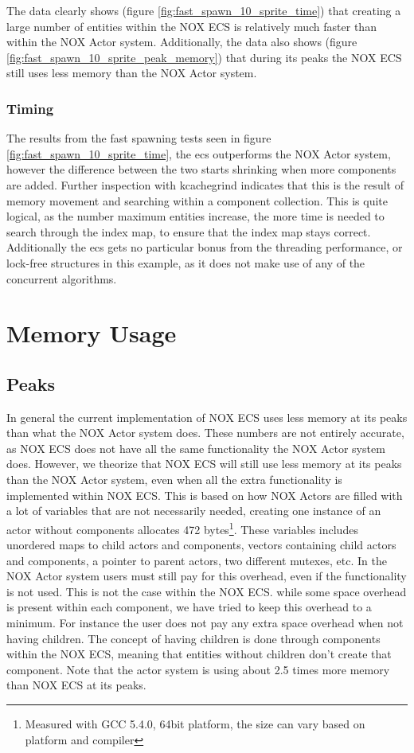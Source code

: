 The data clearly shows (figure \ref{fig:fast_spawn_10_sprite_time}) that creating a large number of entities within the NOX ECS is relatively much faster than within the NOX Actor system.
Additionally, the data also shows (figure \ref{fig:fast_spawn_10_sprite_peak_memory}) that during its peaks the NOX ECS still uses less memory than the NOX Actor system.

\subsubsection{Timing}
The results from the fast spawning tests seen in figure \ref{fig:fast_spawn_10_sprite_time},
the ecs outperforms the NOX Actor system, however the difference between the two
starts shrinking when more components are added.
Further inspection with kcachegrind indicates that this is the result of memory movement and searching within a component collection.
This is quite logical, as the number maximum entities increase, the more time is needed
to search through the index map, to ensure that the index map stays correct.
Additionally the ecs gets no particular bonus from the threading performance, or lock-free structures
in this example, as it does not make use of any of the concurrent algorithms.

\section{Memory Usage}
\subsection{Peaks}
In general the current implementation of NOX ECS uses less memory at its peaks than what the NOX Actor system does.
These numbers are not entirely accurate, as NOX ECS does not have all the same functionality the NOX Actor system does.
However, we theorize that NOX ECS will still use less memory at its peaks than the NOX Actor system, even when
all the extra functionality is implemented within NOX ECS.
This is based on how NOX Actors are filled with a lot of variables that are not necessarily needed,
creating one instance of an actor without components allocates 472 bytes\footnote{Measured with GCC 5.4.0, 64bit platform, the size can vary based on platform and compiler}.
These variables includes unordered maps to child actors and components, vectors containing child actors and components,
a pointer to parent actors, two different mutexes, etc.
In the NOX Actor system users must still pay for this overhead, even if the functionality is not used.
This is not the case within the NOX ECS.
while some space overhead is present within each component, we have tried to keep this overhead to a minimum.
For instance the user does not pay any extra space overhead when not having children.
The concept of having children is done through components within the NOX ECS, meaning that entities without children
don't create that component.
Note that the actor system is using about 2.5 times more memory than NOX ECS at its peaks.

